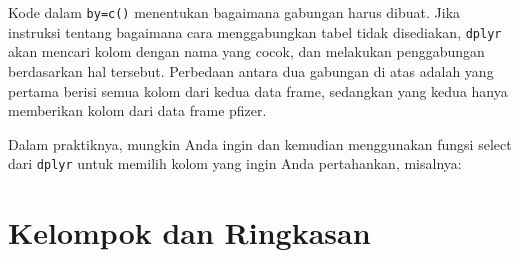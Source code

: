 \documentclass[
]{book}
\newenvironment{Shaded}{\begin{snugshade}}{\end{snugshade}}
\newcommand{\DataTypeTok}[1]{\textcolor[rgb]{0.13,0.29,0.53}{#1}}
\newcommand{\DecValTok}[1]{\textcolor[rgb]{0.00,0.00,0.81}{#1}}
\newcommand{\KeywordTok}[1]{\textcolor[rgb]{0.13,0.29,0.53}{\textbf{#1}}}
\newcommand{\NormalTok}[1]{#1}
\newcommand{\OperatorTok}[1]{\textcolor[rgb]{0.81,0.36,0.00}{\textbf{#1}}}
\newcommand{\StringTok}[1]{\textcolor[rgb]{0.31,0.60,0.02}{#1}}
\begin{document}
Kode dalam \texttt{by=c()} menentukan bagaimana gabungan harus dibuat. Jika instruksi tentang bagaimana cara menggabungkan tabel tidak disediakan, \texttt{dplyr} akan mencari kolom dengan nama yang cocok, dan melakukan penggabungan berdasarkan hal tersebut. Perbedaan antara dua gabungan di atas adalah yang pertama berisi semua kolom dari kedua data frame, sedangkan yang kedua hanya memberikan kolom dari data frame pfizer.

Dalam praktiknya, mungkin Anda ingin dan kemudian menggunakan fungsi select dari \texttt{dplyr} untuk memilih kolom yang ingin Anda pertahankan, misalnya:

\begin{Shaded}
\end{Shaded}

\hypertarget{kelompok-dan-ringkasan}{%
\section{Kelompok dan Ringkasan}\label{kelompok-dan-ringkasan}}
\end{document}

